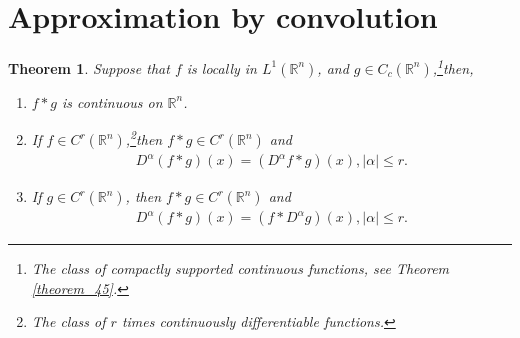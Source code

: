 \documentclass[11pt]{book}
\newtheorem{theorem}{Theorem}[chapter]
\theoremstyle{definition}
\numberwithin{equation}{chapter}
\begin{document}
\medskip





\section{Approximation by convolution}

\begin{theorem}\label{theorem_311}
Suppose that $f$ is locally in $L^1(\mathbb{R}^n)$, and $g \in C_c(\mathbb{R}^n)$,\footnote{The class of compactly supported continuous functions, see Theorem \ref{theorem_45}.}then,
\begin{enumerate}[label=(\alph*)]
    \item $f*g$ is continuous on $\mathbb{R}^n$.
    
    \item If $f \in C^r(\mathbb{R}^n)$,\footnote{The class of $r$ times continuously differentiable functions.}then $f*g \in C^r(\mathbb{R}^n)$ and
    \begin{align*}
        D^{\alpha}(f*g)(x) = \left(D^{\alpha}f*g\right)(x), \left|\alpha\right| \leq r.
    \end{align*}
    
    \item If $g \in C^r(\mathbb{R}^n)$, then $f*g \in C^r(\mathbb{R}^n)$ and
    \begin{align*}
        D^{\alpha}(f*g)(x) = \left(f*D^{\alpha}g\right)(x), \left|\alpha\right| \leq r.
    \end{align*}
\end{enumerate}
\end{theorem}
\end{document}
